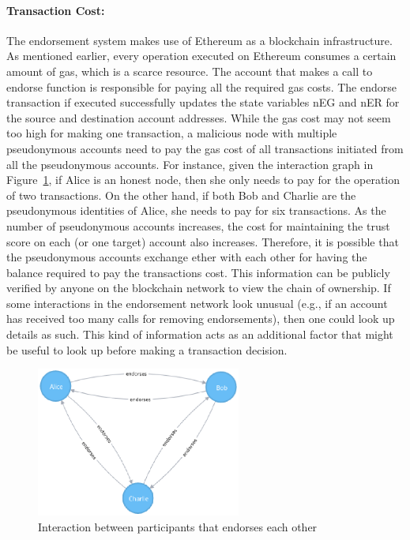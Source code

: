 \paragraph{Transaction Cost:}The endorsement system makes use of Ethereum as a
blockchain infrastructure. As mentioned earlier, every operation executed on
Ethereum consumes a certain amount of gas, which is a scarce resource. The
account that makes a call to endorse function is responsible for paying all the
required gas costs. The endorse transaction if executed successfully updates
the state variables \ac{nEG} and \ac{nER} for the source and destination
account addresses. While the gas cost may not seem too high for making one
transaction, a malicious node with multiple pseudonymous accounts need to pay
the gas cost of all transactions initiated from all the pseudonymous accounts.
For instance, given the interaction graph in Figure~\ref{fig:subgraphexample},
if Alice is an honest node, then she only needs to pay for the operation of two
transactions. On the other hand, if both Bob and Charlie are the pseudonymous
identities of Alice, she needs to pay for six transactions. As the number of
pseudonymous accounts increases, the cost for maintaining the trust score on
each (or one target) account also increases. Therefore, it is possible that the
pseudonymous accounts exchange ether with each other for having the balance
required to pay the transactions cost. This information can be publicly
verified by anyone on the blockchain network to view the chain of ownership. If
some interactions in the endorsement network look unusual (e.g., if an account
has received too many calls for removing endorsements), then one could look up
details as such. This kind of information acts as an additional factor that
might be useful to look up before making a transaction decision. 
\begin{figure}
	\centering
	\includegraphics[width=0.6\textwidth ]{Images/subgraphexample.eps}
	\caption{Interaction between participants that endorses each other}
	\label{fig:subgraphexample}
\end{figure}
